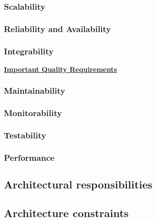 \documentclass[a4paper,12pt,titlepage]{article}
\begin{document}
		\subsubsection{Scalability}
			
			
		\subsubsection{Reliability and Availability}
			
			
		\subsubsection{Integrability}
			
		\underline{\textbf{Important Quality Requirements}}
			
		\subsubsection{Maintainability}
			
			
		\subsubsection{Monitorability}
			
			
		\subsubsection{Testability}
			
			
		\subsubsection{Performance}

	\subsection{Architectural responsibilities}
	\subsection{Architecture constraints}	



\end{document}
